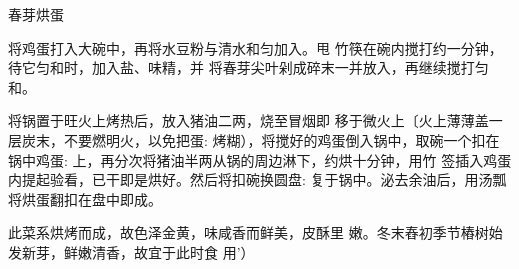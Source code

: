 \begin{recipe}{春芽烘蛋}

\ingredients


\cooking

\step 将鸡蛋打入大碗中，再将水豆粉与清水和匀加入。甩 竹筷在碗内搅打约一分钟，待它匀和时，加入盐、味精，并 将春芽尖叶剁成碎末一并放入，再继续搅打匀和。

\step 将锅置于旺火上烤热后，放入猪油二两，烧至冒烟即 移于微火上〔火上薄薄盖一层炭末，不要燃明火，以免把蛋: 烤糊），将搅好的鸡蛋倒入锅中，取碗一个扣在锅中鸡蛋: 上，再分次将猪油半两从锅的周边淋下，约烘十分钟，用竹 签插入鸡蛋内提起验看，已干即是烘好。然后将扣碗换圆盘: 复于锅中。泌去余油后，用汤瓢将烘蛋翻扣在盘中即成。

\notes

此菜系烘烤而成，故色泽金黄，味咸香而鲜美，皮酥里 嫩。冬末舂初季节樁树始发新芽，鲜嫩清香，故宜于此时食 用'）

\end{recipe}


